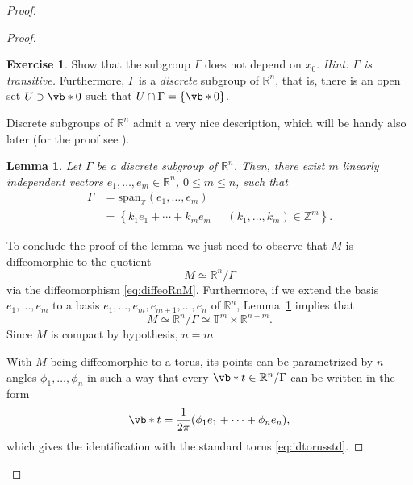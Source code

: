 \documentclass[english,fontsize=11pt,paper=b5]{scrbook}
\newtheorem{lemma}[theorem]{Lemma}
\theoremstyle{definition}
\newtheorem{exercise}{Exercise}[chapter]
\begin{document}
\begin{proof}
\begin{proof}
          \begin{exercise}
            Show that the subgroup $\Gamma$ does not depend on $x_0$. \textit{Hint: $\Gamma$ is transitive.}
            Furthermore, $\Gamma$ is a \emph{discrete} subgroup of $\mathbb{R}^n$, that is, there is an open set $U \ni \vb* 0$ such that $U\cap\Gamma = \{\vb* 0\}$.
          \end{exercise}

          Discrete subgroups of $\mathbb{R}^n$ admit a very nice description, which will be handy also later (for the proof see \cite[Lemma 13.4]{book:knauf}).

          \begin{lemma}
            \label{lem:reprTm}
            Let $\Gamma$ be a discrete subgroup of $\mathbb{R}^n$. Then, there exist $m$ linearly independent vectors $e_1, \ldots, e_m \in \mathbb{R}^n$, $0\leq m \leq n$, such that
            \begin{align}
              \Gamma & = \mathrm{span}_{\mathbb{Z}}(e_1, \ldots, e_m) \\
                     & = \left\{
                       k_1 e_1 + \cdots + k_m e_m \;\mid\; (k_1, \ldots, k_m)\in\mathbb{Z}^m
                     \right\}.
            \end{align}
          \end{lemma}

          To conclude the proof of the lemma we just need to observe that $M$ is diffeomorphic to the quotient
          \begin{equation}
            M \simeq \mathbb{R}^n / \Gamma
          \end{equation}
          via the diffeomorphism \eqref{eq:diffeoRnM}. Furthermore, if we extend the basis $e_1, \ldots, e_m$ to a basis $e_1, \ldots, e_m, e_{m+1}, \ldots,e_n$ of $\mathbb{R}^n$, Lemma~\ref{lem:reprTm} implies that
          \begin{equation}
            M \simeq \mathbb{R}^n / \Gamma \simeq \mathbb{T}^m \times \mathbb{R}^{n-m}.
          \end{equation}
          Since $M$ is compact by hypothesis, $n=m$.

          With $M$ being diffeomorphic to a torus, its points can be parametrized by $n$ angles $\phi_1, \ldots, \phi_n$ in such a way that every $\vb* t \in \mathbb{R}^n/\Gamma$ can be written in the form
          \begin{equation}
            \vb* t = \frac 1{2\pi}(\phi_1 e_1 + \cdots + \phi_n e_n),
          \end{equation}
          which gives the identification with the standard torus \eqref{eq:idtorusstd}.
        \end{proof}


\end{proof}
\end{document}
